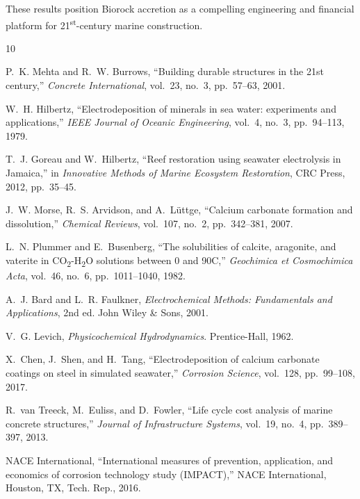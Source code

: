 \documentclass[journal,twocolumn]{IEEEtran}
\begin{document}
These results position Biorock accretion as a compelling engineering and financial platform for 21\textsuperscript{st}-century marine construction.

\begin{thebibliography}{10}

P.~K. Mehta and R.~W. Burrows,
``Building durable structures in the 21st century,''
\textit{Concrete International}, vol.~23, no.~3, pp.~57--63, 2001.

W.~H. Hilbertz,
``Electrodeposition of minerals in sea water: experiments and applications,''
\textit{IEEE Journal of Oceanic Engineering}, vol.~4, no.~3, pp.~94--113, 1979.

T.~J. Goreau and W.~Hilbertz,
``Reef restoration using seawater electrolysis in Jamaica,''
in \textit{Innovative Methods of Marine Ecosystem Restoration},
CRC Press, 2012, pp.~35--45.

J.~W. Morse, R.~S. Arvidson, and A.~Lüttge,
``Calcium carbonate formation and dissolution,''
\textit{Chemical Reviews}, vol.~107, no.~2, pp.~342--381, 2007.

L.~N. Plummer and E.~Busenberg,
``The solubilities of calcite, aragonite, and vaterite in CO\textsubscript{2}-H\textsubscript{2}O solutions between 0 and 90\textdegree{}C,''
\textit{Geochimica et Cosmochimica Acta}, vol.~46, no.~6, pp.~1011--1040, 1982.

A.~J. Bard and L.~R. Faulkner,
\textit{Electrochemical Methods: Fundamentals and Applications}, 2nd ed.
John Wiley \& Sons, 2001.

V.~G. Levich,
\textit{Physicochemical Hydrodynamics}.
Prentice-Hall, 1962.

X.~Chen, J.~Shen, and H.~Tang,
``Electrodeposition of calcium carbonate coatings on steel in simulated seawater,''
\textit{Corrosion Science}, vol.~128, pp.~99--108, 2017.

R.~van Treeck, M.~Euliss, and D.~Fowler,
``Life cycle cost analysis of marine concrete structures,''
\textit{Journal of Infrastructure Systems}, vol.~19, no.~4, pp.~389--397, 2013.

NACE International,
``International measures of prevention, application, and economics of corrosion technology study (IMPACT),''
NACE International, Houston, TX, Tech. Rep., 2016.

\end{thebibliography}
\end{document}
